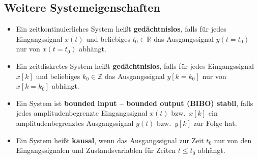 \subsection{Weitere Systemeigenschaften}
\label{sec:weitere-systemeigenschaften}

\begin{definition}
\begin{itemize}
  \item Ein zeitkontinuierliches System heißt \textbf{gedächtnislos}, falls für jedes Eingangssignal $x(t)$ und beliebiges $t_0 \in \mathbb{R}$ das Ausgangssignal $y(t = t_0)$ nur von $x(t = t_0)$ abhängt.
  \item Ein zeitdiskretes System heißt \textbf{gedächtnislos}, falls für jedes Eingangssignal $x[k]$ und beliebiges $k_0 \in \mathbb{Z}$ das Ausgangssignal $y[k = k_0]$ nur von $x[k = k_0]$ abhängt.
  \item Ein System ist \textbf{bounded input -- bounded output (BIBO) stabil}, falls jedes amplitudenbegrenzte Eingangssignal $x(t)$ bzw.\ $x[k]$ ein amplitudenbegrenztes Ausgangssignal $y(t)$ bzw.\ $y[k]$ zur Folge hat.
  \item Ein System heißt \textbf{kausal}, wenn das Ausgangssignal zur Zeit $t_0$ nur von den Eingangssignalen und Zustandsvariablen für Zeiten $t \leq t_0$ abhängt.
\end{itemize}
\end{definition}

